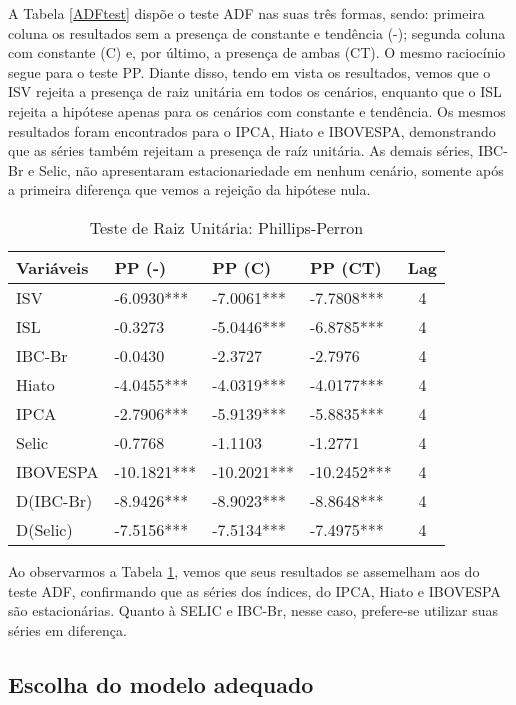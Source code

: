 A Tabela \ref{ADFtest} dispõe o teste ADF nas suas três formas, sendo: primeira coluna os resultados sem a presença de constante e tendência (-); segunda coluna com constante (C) e, por último, a presença de ambas (CT). O mesmo raciocínio segue para o teste PP. Diante disso, tendo em vista os resultados, vemos que o ISV rejeita a presença de raiz unitária em todos os cenários, enquanto que o ISL rejeita a hipótese apenas para os cenários com constante e tendência. Os mesmos resultados foram encontrados para o IPCA, Hiato e IBOVESPA, demonstrando que as séries também rejeitam a presença de raíz unitária. As demais séries, IBC-Br e Selic, não apresentaram estacionariedade em nenhum cenário, somente após a primeira diferença que vemos a rejeição da hipótese nula.

\begin{table}[!h]
    \centering
    \caption{Teste de Raiz Unitária: Phillips-Perron}
    \begin{tabular}{llllc}
    \hline
Variáveis & PP (-) & PP (C) & PP (CT) & Lag \\
    \hline
ISV       & -6.0930*** & -7.0061*** & -7.7808*** & 4 \\
ISL       & -0.3273    & -5.0446*** & -6.8785*** & 4 \\
IBC-Br    & -0.0430    & -2.3727    & -2.7976    & 4 \\
Hiato     & -4.0455*** & -4.0319*** & -4.0177*** & 4 \\
IPCA      & -2.7906*** & -5.9139*** & -5.8835*** & 4 \\
Selic     & -0.7768    & -1.1103    & -1.2771    & 4 \\
IBOVESPA  & -10.1821***& -10.2021***& -10.2452***& 4 \\
D(IBC-Br) & -8.9426*** & -8.9023*** & -8.8648*** & 4 \\
D(Selic)  & -7.5156*** & -7.5134*** & -7.4975*** & 4 \\
    \hline
    \end{tabular} \label{PPtest}
\end{table}

Ao observarmos a Tabela \ref{PPtest}, vemos que seus resultados se assemelham aos do teste ADF, confirmando que as séries dos índices, do IPCA, Hiato e IBOVESPA são estacionárias. Quanto à SELIC e IBC-Br, nesse caso, prefere-se utilizar suas séries em diferença.

\subsection{Escolha do modelo adequado}

